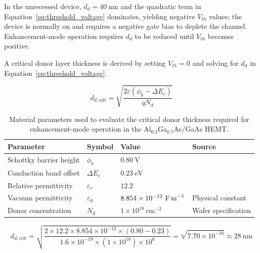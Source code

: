 In the unrecessed device, $d_d = 40~\text{nm}$ and the quadratic term
in Equation~\ref{eq:threshold_voltage} dominates, yielding negative $V_{th}$ values;
the device is normally on and requires a negative gate bias to deplete the
channel. \cite{Mimura1980} Enhancement-mode operation requires $d_d$ to be
reduced until $V_{th}$ becomes positive.  

A critical donor layer thickness is derived by setting $V_{th} = 0$ and solving 
for $d_d$ in Equation~\ref{eq:threshold_voltage}.

\begin{equation}
    d_{d,\text{crit}} = \sqrt{\frac{2\varepsilon
    \left(\phi_b - \Delta E_c\right)}{q N_d}}
    \label{eq:crit_donor}
\end{equation}

\begin{table}[htbp]
    \centering
    \small
    \begin{tabular}{llll}
        \toprule
        Parameter               & Symbol           & Value                                    & Source              \\
        \midrule
        Schottky barrier height & $\phi_b$         & $0.80~\text{V}$                          & \cite{ivcv-hemt}    \\
        Conduction band offset  & $\Delta E_c$     & $0.23~\text{eV}$                         & \cite{liu1999}      \\
        Relative permittivity   & $\varepsilon_r$  & $12.2$                                   & \cite{liu1999}      \\
        Vacuum permittivity     & $\varepsilon_0$  & $8.854\times10^{-12}~\text{F\,m}^{-1}$  & Physical constant   \\
        Donor concentration     & $N_d$            & $1\times10^{18}~\text{cm}^{-3}$          & Wafer specification \\
        \bottomrule
    \end{tabular}
    \caption{Material parameters used to evaluate the critical donor thickness
    required for enhancement-mode operation in the
    Al$_{0.3}$Ga$_{0.7}$As/GaAs HEMT.}
    \label{tab:threshold_params}
\end{table}

\begin{equation}
    d_{d,\text{crit}} =
    \sqrt{\frac{2 \times 12.2 \times 8.854\times10^{-12} \times
    (0.80 - 0.23)}{1.6\times10^{-19} \times (1\times10^{18}) \times 10^{6}}}
    = \sqrt{7.70\times10^{-16}}
    \approx 28~\text{nm}
    \label{eq:crit_donor_eval}
\end{equation}

